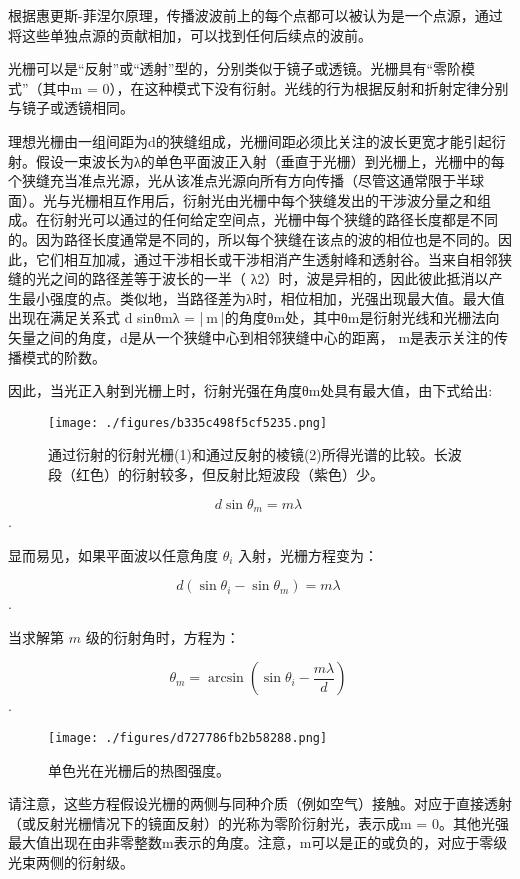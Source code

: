 根据惠更斯-菲涅尔原理，传播波波前上的每个点都可以被认为是一个点源，通过将这些单独点源的贡献相加，可以找到任何后续点的波前。

光栅可以是“反射”或“透射”型的，分别类似于镜子或透镜。光栅具有“零阶模式”（其中m = 0），在这种模式下没有衍射。光线的行为根据反射和折射定律分别与镜子或透镜相同。

理想光栅由一组间距为d的狭缝组成，光栅间距必须比关注的波长更宽才能引起衍射。假设一束波长为λ的单色平面波正入射（垂直于光栅）到光栅上，光栅中的每个狭缝充当准点光源，光从该准点光源向所有方向传播（尽管这通常限于半球面）。光与光栅相互作用后，衍射光由光栅中每个狭缝发出的干涉波分量之和组成。在衍射光可以通过的任何给定空间点，光栅中每个狭缝的路径长度都是不同的。因为路径长度通常是不同的，所以每个狭缝在该点的波的相位也是不同的。因此，它们相互加减，通过干涉相长或干涉相消产生透射峰和透射谷。当来自相邻狭缝的光之间的路径差等于波长的一半（ λ2）时，波是异相的，因此彼此抵消以产生最小强度的点。类似地，当路径差为λ时，相位相加，光强出现最大值。最大值出现在满足关系式 d sinθmλ = | m |的角度θm处，其中θm是衍射光线和光栅法向矢量之间的角度，d是从一个狭缝中心到相邻狭缝中心的距离， m是表示关注的传播模式的阶数。

因此，当光正入射到光栅上时，衍射光强在角度θm处具有最大值，由下式给出:

\begin{figure}[ht]
\centering
\texttt{[image: ./figures/b335c498f5cf5235.png]}
\caption{通过衍射的衍射光栅(1)和通过反射的棱镜(2)所得光谱的比较。长波段（红色）的衍射较多，但反射比短波段（紫色）少。} \label{fig_YSGS_2}
\end{figure}

$$ d \sin \theta_m = m \lambda~$$.

显而易见，如果平面波以任意角度 $\theta_i$ 入射，光栅方程变为：

$$d (\sin \theta_i - \sin \theta_m) = m \lambda~$$.

当求解第 $m$ 级的衍射角时，方程为：

$$\theta_m = \arcsin \left( \sin \theta_i - \frac{m \lambda}{d} \right)~$$.
\begin{figure}[ht]
\centering
\texttt{[image: ./figures/d727786fb2b58288.png]}
\caption{单色光在光栅后的热图强度。} \label{fig_YSGS_3}
\end{figure}
请注意，这些方程假设光栅的两侧与同种介质（例如空气）接触。对应于直接透射（或反射光栅情况下的镜面反射）的光称为零阶衍射光，表示成m = 0。其他光强最大值出现在由非零整数m表示的角度。注意，m可以是正的或负的，对应于零级光束两侧的衍射级。


